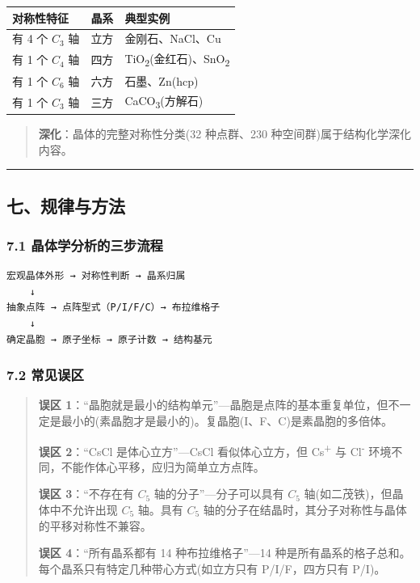 \documentclass[a4paper,11pt]{ctexart}
\newcounter{none}
\newcommand{\箭}{\ensuremath{\rightarrow}}
\newcommand{\左箭}{\ensuremath{\leftarrow}}
\newcommand{\上箭}{\ensuremath{\uparrow}}
\newcommand{\下箭}{\ensuremath{\downarrow}}
\newcommand{\衡}{\ensuremath{\rightleftharpoons}}
\newcommand{\双箭}{\ensuremath{\leftrightarrow}}
\newcommand{\约等于}{\ensuremath{\approx}}
\newcommand{\小于等于}{\ensuremath{\leq}}
\newcommand{\大于等于}{\ensuremath{\geq}}
\newcommand{\不等于}{\ensuremath{\neq}}
\newcommand{\西格马}{\ensuremath{\sigma}}
\newcommand{\派}{\ensuremath{\pi}}
\begin{document}
{\def\LTcaptype{none} %
\begin{longtable}[]{@{}lcl@{}}
\toprule\noalign{}
对称性特征 & 晶系 & 典型实例 \\
\midrule\noalign{}
\endhead
\bottomrule\noalign{}
\endlastfoot
有 4 个 \(C_3\) 轴 & 立方 & 金刚石、NaCl、Cu \\
有 1 个 \(C_4\) 轴 & 四方 & TiO\textsubscript{2}(金红石)、SnO\textsubscript{2} \\
有 1 个 \(C_6\) 轴 & 六方 & 石墨、Zn(hcp) \\
有 1 个 \(C_3\) 轴 & 三方 & CaCO\textsubscript{3}(方解石) \\
\end{longtable}
}

\begin{quote}
\textbf{深化}：晶体的完整对称性分类(32 种点群、230 种空间群)属于结构化学深化内容。
\end{quote}

\begin{center}\rule{0.5\linewidth}{0.5pt}\end{center}

\subsection{七、规律与方法}\label{ux4e03ux89c4ux5f8bux4e0eux65b9ux6cd5}

\subsubsection{7.1 晶体学分析的三步流程}\label{ux6676ux4f53ux5b66ux5206ux6790ux7684ux4e09ux6b65ux6d41ux7a0b}

\begin{verbatim}
宏观晶体外形 → 对称性判断 → 晶系归属
    ↓
抽象点阵 → 点阵型式（P/I/F/C）→ 布拉维格子
    ↓
确定晶胞 → 原子坐标 → 原子计数 → 结构基元
\end{verbatim}

\subsubsection{7.2 常见误区}\label{ux5e38ux89c1ux8befux533a}

\begin{quote}
\textbf{误区 1}：``晶胞就是最小的结构单元''---晶胞是点阵的基本重复单位，但不一定是最小的(素晶胞才是最小的)。复晶胞(I、F、C)是素晶胞的多倍体。

\textbf{误区 2}：``CsCl 是体心立方''---CsCl 看似体心立方，但 Cs\textsuperscript{+} 与 Cl\textsuperscript{-} 环境不同，不能作体心平移，应归为简单立方点阵。

\textbf{误区 3}：``不存在有 \(C_5\) 轴的分子''---分子可以具有 \(C_5\) 轴(如二茂铁)，但晶体中不允许出现 \(C_5\) 轴。具有 \(C_5\) 轴的分子在结晶时，其分子对称性与晶体的平移对称性不兼容。

\textbf{误区 4}：``所有晶系都有 14 种布拉维格子''---14 种是所有晶系的格子总和。每个晶系只有特定几种带心方式(如立方只有 P/I/F，四方只有 P/I)。
\end{quote}
\end{document}
